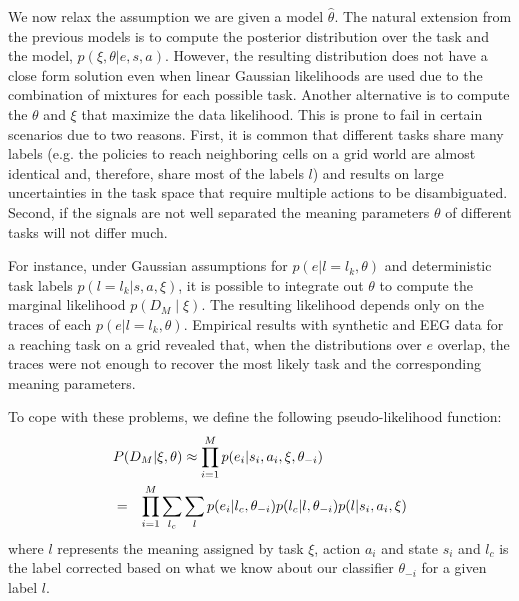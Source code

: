 

We now relax the assumption we are given a model $\hat{\theta}$. The natural extension from the previous models is to compute the posterior distribution over the task and the model, $p(\xi, \theta |e, s, a)$. However, the resulting distribution does not have a close form solution even when linear Gaussian likelihoods are used due to the combination of mixtures for each possible task. Another alternative is to compute the $\theta$ and $\xi$ that maximize the data likelihood. This is prone to fail in certain scenarios due to two reasons. First, it is common that different tasks share many labels (e.g. the policies to reach neighboring cells on a grid world are almost identical and, therefore, share most of the labels $l$) and results on large uncertainties in the task space that require multiple actions to be disambiguated. Second, if the signals are not well separated the meaning parameters $\theta$ of different tasks will not differ much.  

For instance, under Gaussian assumptions for $p(e |l = l_k, \theta)$ and deterministic task labels $p(l = l_k| s, a, \xi)$, it is possible to integrate out  $\theta$ to compute the marginal likelihood $p(D_M\mid \xi)$. The resulting likelihood depends only on the traces of each $p(e |l = l_k, \theta)$. Empirical results with synthetic and EEG data for a reaching task on a grid revealed that, when the distributions over $e$ overlap, the traces were not enough to recover the most likely task and the corresponding meaning parameters. 

To cope with these problems, we define the following pseudo-likelihood function:
%
\begin{eqnarray}\label{eq:pseudo1}
\lefteqn{P(D_M | \xi, \theta) \approx \prod_{i=1}^M p(e_i | s_i, a_i, \xi, \theta_{-i})}  \\ \label{eq:pseudo2}
&=& \prod_{i=1}^M \sum_{l_c}\sum_l  p(e_i | l_c, \theta_{-i})  p(l_c | l, \theta_{-i}) p(l|s_i,a_i,\xi)
\label{eq:}
\end{eqnarray}
%
where $l$ represents the meaning assigned by task $\xi$, action $a_i$ and state $s_i$ and $l_c$ is the label corrected based on what we know about our classifier $\theta_{-i}$ for a given label $l$.

